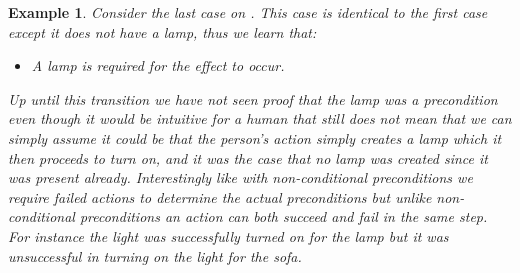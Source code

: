 \documentclass[../Master.tex]{subfiles}
\begin{document}
 \newtheorem{thm-house-example-3}{Example}[section]
 \begin{thm-house-example-3}\label{thm:house-example-3}
 Consider the last case on . This case is identical
to the first case except it does not have a lamp, thus we learn that:
\begin{itemize}
	\item A lamp is required for the effect to occur.
\end{itemize}
Up until this transition we have not seen proof that the lamp was a precondition even though it would be intuitive for a human that still
does not mean that we can simply assume it could be that the person's action simply creates a
lamp which it then proceeds to turn on, and it was the case that no
lamp was created since it was present already.
Interestingly like with non-conditional preconditions we require failed actions to determine the actual preconditions but unlike non-conditional preconditions an action can both succeed and fail in the same step. For instance the light was successfully turned on for the lamp but it was unsuccessful in turning on the light for the sofa. 

\end{thm-house-example-3}
\end{document}
